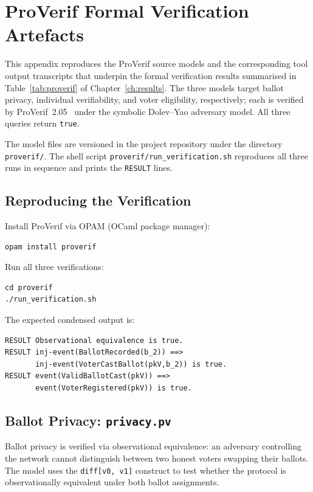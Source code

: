 \appendix
\chapter{ProVerif Formal Verification Artefacts}
\label{appx:proverif}

This appendix reproduces the ProVerif source models and the corresponding tool output transcripts that underpin the formal verification results summarised in Table~\ref{tab:proverif} of Chapter~\ref{ch:results}. The three models target ballot privacy, individual verifiability, and voter eligibility, respectively; each is verified by ProVerif~2.05~\cite{blanchet2016} under the symbolic Dolev--Yao adversary model. All three queries return \texttt{true}.

The model files are versioned in the project repository under the directory \texttt{proverif/}. The shell script \texttt{proverif/run\_verification.sh} reproduces all three runs in sequence and prints the \texttt{RESULT} lines.

\section{Reproducing the Verification}
\label{sec:appx-proverif-repro}

Install ProVerif via OPAM (OCaml package manager):
\begin{verbatim}
opam install proverif
\end{verbatim}

Run all three verifications:
\begin{verbatim}
cd proverif
./run_verification.sh
\end{verbatim}

The expected condensed output is:
\begin{verbatim}
RESULT Observational equivalence is true.
RESULT inj-event(BallotRecorded(b_2)) ==>
       inj-event(VoterCastBallot(pkV,b_2)) is true.
RESULT event(ValidBallotCast(pkV)) ==>
       event(VoterRegistered(pkV)) is true.
\end{verbatim}

\section{Ballot Privacy: \texttt{privacy.pv}}
\label{sec:appx-proverif-privacy}

Ballot privacy is verified via observational equivalence: an adversary controlling the network cannot distinguish between two honest voters swapping their ballots. The model uses the \texttt{diff[v0, v1]} construct to test whether the protocol is observationally equivalent under both ballot assignments.

